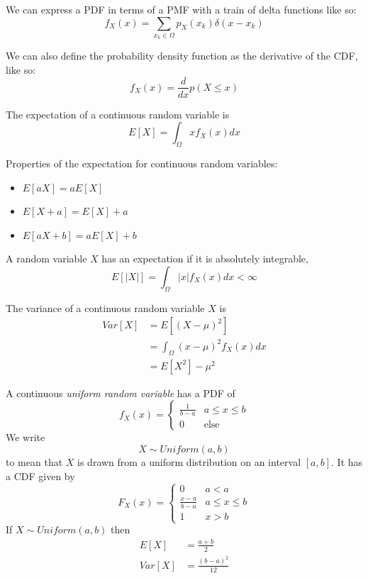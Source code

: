 We can express a PDF in terms of a PMF
with a train of delta functions like so:
\begin{equation}
    f_X(x) = \sum_{x_k \in \Omega} p_X(x_k) \delta(x - x_k)
\end{equation}

We can also define the probability density
function as the derivative of the CDF, like so:
\begin{equation}
    f_X(x) = \frac{d}{dx}p(X \leq x)
\end{equation}

The expectation of a continuous random variable is
\begin{equation}
    E[X] = \int_{\Omega} xf_X(x)dx
\end{equation}

Properties of the expectation for continuous
random variables:
\begin{itemize}
    \item $E[aX] = aE[X]$
    \item $E[X+a] = E[X] + a$
    \item $E[aX+b] = aE[X] + b$
\end{itemize}

A random variable $X$ has an expectation
if it is absolutely integrable,
\begin{equation}
    E[|X|] = \int_{\Omega} |x|f_X(x)dx < \infty
\end{equation}

The variance of a continuous random variable
$X$ is
\begin{align}
    Var[X] & = E[(X-\mu)^2]                    \\
           & = \int_{\Omega} (x-\mu)^2f_X(x)dx \\
           & = E[X^2] - \mu^2
\end{align}

A continuous \emph{uniform random variable}
has a PDF of
\begin{equation}
    f_X(x) = \begin{cases}
        \frac{1}{b-a} & a \leq x \leq b \\
        0             & \text{else}
    \end{cases}
\end{equation}
We write
\begin{equation}
    X \sim Uniform(a,b)
\end{equation}
to mean that $X$ is drawn from a uniform
distribution on an interval $[a, b]$.
It has a CDF given by
\begin{equation}
    F_X(x) = \begin{cases}
        0               & a < a           \\
        \frac{x-a}{b-a} & a \leq x \leq b \\
        1               & x > b
    \end{cases}
\end{equation}
If $X \sim Uniform(a,b)$ then
\begin{align}
    E[X]   & = \frac{a + b}{2}      \\
    Var[X] & = \frac{(b - a)^2}{12}
\end{align}

